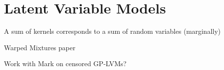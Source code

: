 
\inbpdocument



\chapter{Latent Variable Models}
\label{ch:gplvm}

A sum of kernels corresponds to a sum of random variables (marginally)

Warped Mixtures paper

Work with Mark on censored GP-LVMs?



\outbpdocument{


}


